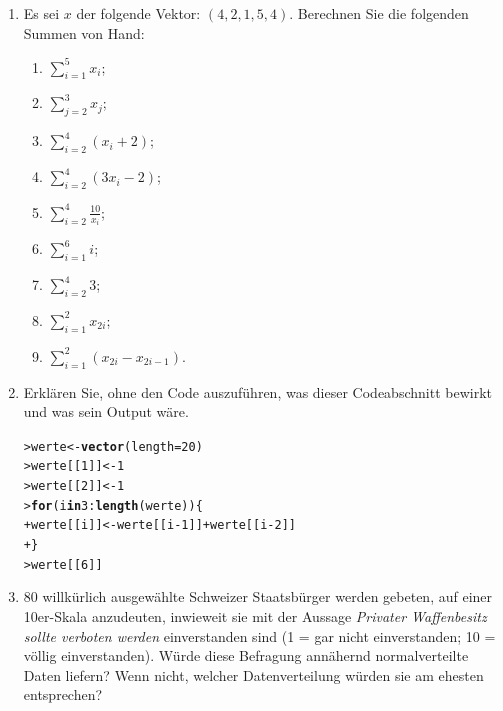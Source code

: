 \documentclass[oneside, 10pt]{book}\usepackage[]{graphicx}\usepackage[]{xcolor}
\makeatletter
\newcommand{\hlnum}[1]{\textcolor[rgb]{0.686,0.059,0.569}{#1}}%
\newcommand{\hlopt}[1]{\textcolor[rgb]{0,0,0}{#1}}%
\newcommand{\hlstd}[1]{\textcolor[rgb]{0.345,0.345,0.345}{#1}}%
\newcommand{\hlkwa}[1]{\textcolor[rgb]{0.161,0.373,0.58}{\textbf{#1}}}%
\newcommand{\hlkwb}[1]{\textcolor[rgb]{0.69,0.353,0.396}{#1}}%
\newcommand{\hlkwc}[1]{\textcolor[rgb]{0.333,0.667,0.333}{#1}}%
\newcommand{\hlkwd}[1]{\textcolor[rgb]{0.737,0.353,0.396}{\textbf{#1}}}%
\newenvironment{kframe}{%
 \def\at@end@of@kframe{}%
 \ifinner\ifhmode%
  \def\at@end@of@kframe{\end{minipage}}%
  \begin{minipage}{\columnwidth}%
 \fi\fi%
 \def\FrameCommand##1{\hskip\@totalleftmargin \hskip-\fboxsep
 \colorbox{shadecolor}{##1}\hskip-\fboxsep
     \hskip-\linewidth \hskip-\@totalleftmargin \hskip\columnwidth}%
 \MakeFramed {\advance\hsize-\width
   \@totalleftmargin\z@ \linewidth\hsize
   \@setminipage}}%
 {\par\unskip\endMakeFramed%
 \at@end@of@kframe}
\newenvironment{knitrout}{}{} %
\makeatother
\begin{document}
\begin{enumerate}

  \item Es sei $x$ der folgende Vektor: $(4, 2, 1, 5, 4)$.
  Berechnen Sie die folgenden Summen von Hand:
  \begin{enumerate}
   \item $\sum_{i=1}^5 x_i$;
   \item $\sum_{j=2}^3 x_j$;
   \item $\sum_{i=2}^4 (x_i + 2)$;
   \item $\sum_{i=2}^4 (3x_i - 2)$;
   \item $\sum_{i=2}^4 \frac{10}{x_i}$;
   \item $\sum_{i=1}^6 i$;
   \item $\sum_{i=2}^4 3$;
   \item $\sum_{i=1}^2 x_{2i}$;
   \item $\sum_{i=1}^2 (x_{2i} - x_{2i-1})$.
  \end{enumerate}

  \item Erklären Sie, ohne den Code auszuführen, was dieser Codeabschnitt bewirkt
  und was sein Output wäre.

\begin{knitrout}
\color{fgcolor}\begin{kframe}
\begin{alltt}
\hlstd{> }\hlstd{werte} \hlkwb{<-} \hlkwd{vector}\hlstd{(}\hlkwc{length} \hlstd{=} \hlnum{20}\hlstd{)}
\hlstd{> }\hlstd{werte[[}\hlnum{1}\hlstd{]]} \hlkwb{<-} \hlnum{1}
\hlstd{> }\hlstd{werte[[}\hlnum{2}\hlstd{]]} \hlkwb{<-} \hlnum{1}
\hlstd{> }\hlkwa{for} \hlstd{(i} \hlkwa{in} \hlnum{3}\hlopt{:}\hlkwd{length}\hlstd{(werte)) \{}
\hlstd{+ }  \hlstd{werte[[i]]} \hlkwb{<-} \hlstd{werte[[i}\hlopt{-}\hlnum{1}\hlstd{]]} \hlopt{+} \hlstd{werte[[i}\hlopt{-}\hlnum{2}\hlstd{]]}
\hlstd{+ }\hlstd{\}}
\hlstd{> }\hlstd{werte[[}\hlnum{6}\hlstd{]]}
\end{alltt}
\end{kframe}
\end{knitrout}

% 

  \item 80 willkürlich ausgewählte Schweizer Staatsbürger werden gebeten, auf einer 10er-Skala anzudeuten,
  inwieweit sie mit der Aussage \textit{Privater Waffenbesitz sollte verboten werden} einverstanden sind
  (1 = gar nicht einverstanden; 10 = völlig einverstanden).
  Würde diese Befragung annähernd normalverteilte Daten liefern?
  Wenn nicht, welcher Datenverteilung würden sie am ehesten entsprechen?
%


\end{enumerate}
\end{document}
